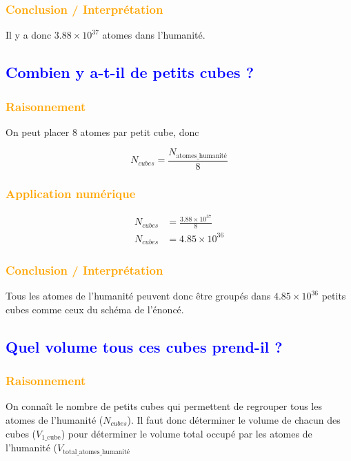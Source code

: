 \documentclass[a4paper,12pt]{article}
\begin{document}
\subsubsection*{\textcolor{orange}{Conclusion / Interprétation}}

Il y a donc $3.88 \times 10^{37}$ atomes dans l'humanité.

\subsection{\textcolor{blue}{Combien y a-t-il de petits cubes ?}}

\subsubsection*{\textcolor{orange}{Raisonnement}}

On peut placer 8 atomes par petit cube, donc 

\[
N_{cubes} = \frac{N_{\text{atomes\_humanité}}}{8}
\]

\subsubsection*{\textcolor{orange}{Application numérique}}

\begin{align*}
  N_{cubes} &= \frac{3.88 \times 10^{37}}{8} \\
  N_{cubes} &= 4.85 \times 10^{36}
\end{align*}

\subsubsection*{\textcolor{orange}{Conclusion / Interprétation}}

Tous les atomes de l'humanité peuvent donc être groupés dans $4.85 \times 10^{36}$ petits cubes comme ceux du schéma de l'énoncé.

\subsection{\textcolor{blue}{Quel volume tous ces cubes prend-il ?}}

\subsubsection*{\textcolor{orange}{Raisonnement}}

On connaît le nombre de petits cubes qui permettent de regrouper tous les atomes de l'humanité ($N_{cubes}$). Il faut donc déterminer le volume de chacun des cubes ($V_{\text{1\_cube}}$) pour déterminer le volume total occupé par les atomes de l'humanité ($V_{\text{total\_atomes\_humanité}}$
\end{document}

